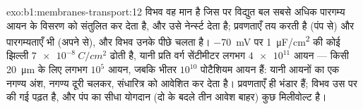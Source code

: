 \begin{solution}{exo:b1:membranes-transport:12}
विभव वह मान है जिस पर विद्युत बल सबसे अधिक पारगम्य आयन के विसरण को
संतुलित कर देता है, और उसे नेर्न्स्ट देता है;  प्रवणताएँ तय करती है
(पंप से) और पारगम्यताएँ भी (अपने  से), और विभव उनके पीछे चलता है।
\qty{-70}{mV} पर \qty{1}{\micro F/cm^2} की कोई झिल्ली
$\qty{7e-8}{C/cm^2}$ ढोती है, यानी प्रति वर्ग सेंटीमीटर लगभग
$\num{4e11}$ आयन --- किसी \qty{20}{\micro m}  के लिए लगभग $10^5$
आयन, जबकि भीतर $10^{10}$ पोटैशियम आयन हैं: यानी आयनों का एक नगण्य अंश,
नगण्य दूरी चलकर, संधारित्र को आवेशित कर देता है।
प्रवणताएँ ही भंडार हैं; विभव उस पर की गई पढ़त है, और
पंप का सीधा योगदान (दो के बदले तीन आवेश बाहर) कुछ
मिलीवोल्ट है।
\end{solution}

